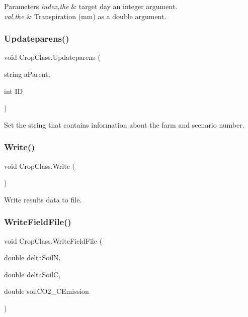 \begin{DoxyParams}{Parameters}
{\em index,the} & target day an integer argument. \\
\hline
{\em val,the} & Transpiration (mm) as a double argument. \\
\hline
\end{DoxyParams}
\mbox{\label{class_crop_class_ad8101a2f08818683b8da9bc39df05fa2}} 
\subsubsection{\texorpdfstring{Updateparens()}{Updateparens()}}
{\footnotesize\ttfamily void Crop\+Class.\+Updateparens (\begin{DoxyParamCaption}\item[{string}]{a\+Parent,  }\item[{int}]{ID }\end{DoxyParamCaption})\hspace{0.3cm}{\ttfamily [inline]}}



Set the string that contains information about the farm and scenario number. 

\mbox{\label{class_crop_class_adcbe888b5ffd4a000e7d45daece3fe84}} 
\subsubsection{\texorpdfstring{Write()}{Write()}}
{\footnotesize\ttfamily void Crop\+Class.\+Write (\begin{DoxyParamCaption}{ }\end{DoxyParamCaption})\hspace{0.3cm}{\ttfamily [inline]}}



Write results data to file. 

\mbox{\label{class_crop_class_a445f68063e9c6afd665b228c488b786b}} 
\subsubsection{\texorpdfstring{WriteFieldFile()}{WriteFieldFile()}}
{\footnotesize\ttfamily void Crop\+Class.\+Write\+Field\+File (\begin{DoxyParamCaption}\item[{double}]{delta\+SoilN,  }\item[{double}]{delta\+SoilC,  }\item[{double}]{soil\+C\+O2\+\_\+\+C\+Emission }\end{DoxyParamCaption})\hspace{0.3cm}{\ttfamily [inline]}}



